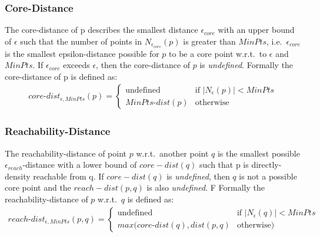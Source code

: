 \subsubsection*{Core-Distance}
The core-distance of p describes the smallest  distance $\epsilon_{core}$ with an upper bound of $\epsilon$ such that the number of points in $N_{\epsilon_{core}}(p)$ is greater than $MinPts$, i.e.\ $\epsilon_{core}$ is the smallest epsilon-distance possible for $p$ to be a core point w.r.t.\ to $\epsilon$ and $MinPts$. If $\epsilon_{core}$ exceeds $\epsilon$, then the core-distance of $p$ is \textit{undefined}. Formally the core-distance of p is defined as:
\begin{align}
    core\text{-}dist_{\epsilon,MinPts}(p)=
    \begin{cases}
        \text{undefined} &\text{if } |N_\epsilon(p)| < MinPts\\
        MinPts\text{-}dist(p) &\text{otherwise}
    \end{cases}
\end{align}

\subsubsection*{Reachability-Distance}
The reachability-distance of point $p$ w.r.t.\ another point $q$ is the smallest possible $\epsilon_{reach}$-distance with a lower bound of $core-dist(q)$ such that p is directly-density reachable from q. If $core-dist(q)$ is \textit{undefined}, then $q$ is not a possible core point and the $reach-dist(p,q)$ is also \textit{undefined}. F
Formally the reachability-distance of $p$ w.r.t.\ $q$ is defined as:
\begin{align}
    reach\text{-}dist_{\epsilon,MinPts}(p,q)=
    \begin{cases}
        \text{undefined} &\text{if } |N_\epsilon(q)| < MinPts\\
        max(core\text{-}dist(q), dist(p,q) &\text{otherwise})
    \end{cases}
\end{align}

